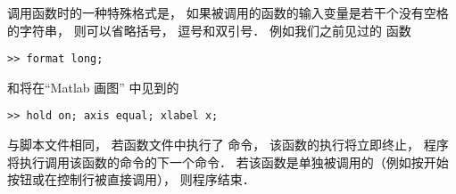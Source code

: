 调用函数时的一种特殊格式是， 如果被调用的函数的输入变量是若干个没有空格的字符串， 则可以省略括号， 逗号和双引号． 例如我们之前见过的  函数
\begin{lstlisting}[language=MatlabCom]
>> format long;
\end{lstlisting}
和将在“Matlab 画图” 中见到的
\begin{lstlisting}[language=MatlabCom]
>> hold on; axis equal; xlabel x;
\end{lstlisting}

与脚本文件相同， 若函数文件中执行了  命令， 该函数的执行将立即终止， 程序将执行调用该函数的命令的下一个命令． 若该函数是单独被调用的（例如按开始按钮或在控制行被直接调用）， 则程序结束．
